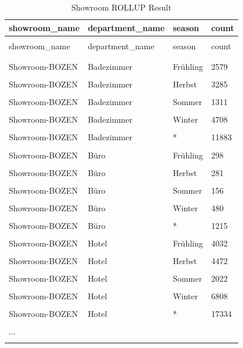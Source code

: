 \documentclass[letterpaper,12pt]{article}
\begin{document}
\begingroup
\renewcommand\arraystretch{0.5}
\begin{longtable}{p{4cm}p{4cm}p{3cm}p{2cm}}
        \caption{Showroom ROLLUP Result} \\
	showroom\_name & department\_name & season & count \\
        \endfirsthead \\
        showroom\_name & department\_name & season & count \\
        \endhead \\
        \hline \\
	Showroom-BOZEN & Badezimmer & Frühling & 2579 \\
        \hline \\
        Showroom-BOZEN & Badezimmer & Herbst & 3285 \\
        \hline \\
        Showroom-BOZEN & Badezimmer & Sommer & 1311 \\
        \hline \\
        Showroom-BOZEN & Badezimmer & Winter & 4708 \\
        \hline \\
        Showroom-BOZEN & Badezimmer & * & 11883 \\
        \hline \\
        Showroom-BOZEN & Büro & Frühling & 298 \\
        \hline \\
        Showroom-BOZEN & Büro & Herbst & 281 \\
        \hline \\
        Showroom-BOZEN & Büro & Sommer & 156 \\
        \hline \\
        Showroom-BOZEN & Büro & Winter & 480 \\
        \hline \\
        Showroom-BOZEN & Büro & * & 1215 \\
        \hline \\
        Showroom-BOZEN & Hotel & Frühling & 4032 \\
        \hline \\
        Showroom-BOZEN & Hotel & Herbst & 4472 \\
        \hline \\
        Showroom-BOZEN & Hotel & Sommer & 2022 \\
        \hline \\
        Showroom-BOZEN & Hotel & Winter & 6808 \\
        \hline \\
        Showroom-BOZEN & Hotel & * & 17334 \\
        \hline \\
        ... \\
        \hline \\
\end{longtable} 
\endgroup
\end{document}
